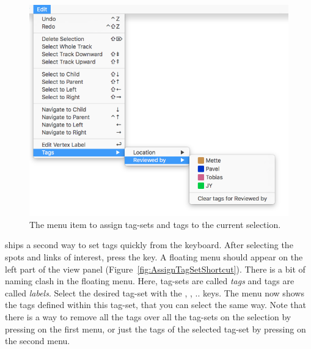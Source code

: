 \begin{figure}
    \centering
    \includegraphics[height=0.2\textheight]{figures/Mastodon_ColorByTagSet_1.png}
    
    \caption{The menu item to assign tag-sets and tags to the current selection. }
    \label{fig:AssignTagSetMenu}
\end{figure}


\TrackScheme ships a second way to set tags quickly from the keyboard.
After selecting the spots and links of interest, press the  key.
A floating menu should appear on the left part of the view panel (Figure~\ref{fig:AssignTagSetShortcut}). 
There is a bit of naming clash in the floating menu.
Here, tag-sets are called \textit{tags} and tags are called \textit{labels}.
Select the desired tag-set with the , , .. keys.
The menu now shows the tags defined within this tag-set, that you can select the same way.
Note that there is a way to remove all the tags over all the tag-sets on the selection by pressing \keys{\shift+\del} on the first menu, or just the tags of the selected tag-set by pressing  on the second menu.


